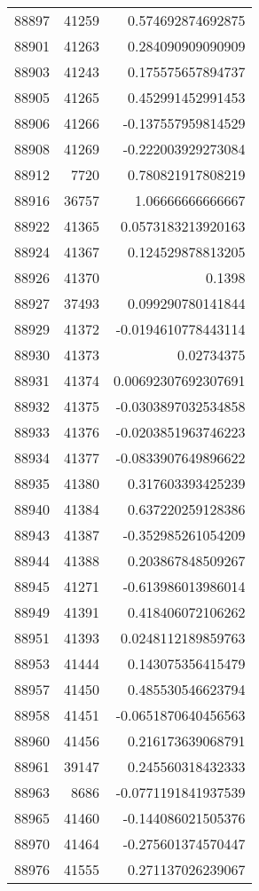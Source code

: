 \begin{tabular}{r | r | r}
88897 & 41259 & 0.574692874692875 \\
88901 & 41263 & 0.284090909090909 \\
88903 & 41243 & 0.175575657894737 \\
88905 & 41265 & 0.452991452991453 \\
88906 & 41266 & -0.137557959814529 \\
88908 & 41269 & -0.222003929273084 \\
88912 & 7720 & 0.780821917808219 \\
88916 & 36757 & 1.06666666666667 \\
88922 & 41365 & 0.0573183213920163 \\
88924 & 41367 & 0.124529878813205 \\
88926 & 41370 & 0.1398 \\
88927 & 37493 & 0.099290780141844 \\
88929 & 41372 & -0.0194610778443114 \\
88930 & 41373 & 0.02734375 \\
88931 & 41374 & 0.00692307692307691 \\
88932 & 41375 & -0.0303897032534858 \\
88933 & 41376 & -0.0203851963746223 \\
88934 & 41377 & -0.0833907649896622 \\
88935 & 41380 & 0.317603393425239 \\
88940 & 41384 & 0.637220259128386 \\
88943 & 41387 & -0.352985261054209 \\
88944 & 41388 & 0.203867848509267 \\
88945 & 41271 & -0.613986013986014 \\
88949 & 41391 & 0.418406072106262 \\
88951 & 41393 & 0.0248112189859763 \\
88953 & 41444 & 0.143075356415479 \\
88957 & 41450 & 0.485530546623794 \\
88958 & 41451 & -0.0651870640456563 \\
88960 & 41456 & 0.216173639068791 \\
88961 & 39147 & 0.245560318432333 \\
88963 & 8686 & -0.0771191841937539 \\
88965 & 41460 & -0.144086021505376 \\
88970 & 41464 & -0.275601374570447 \\
88976 & 41555 & 0.271137026239067 \\

\end{tabular}
